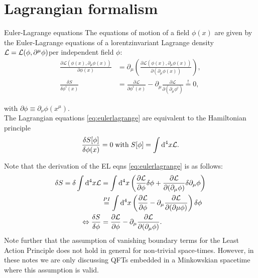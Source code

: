 \section{Lagrangian formalism}
\begin{mybox}{Euler-Lagrange equations}
	The equations of motion of a field $\phi(x)$ are given by the Euler-Lagrange equations of a lorentzinvariant Lagrange density $\mathcal{L} = \mathcal{L}(\phi,\partial^\mu\phi)$per independent field $\phi$:
	\begin{align}
	\label{eq:eulerlagrange}
	\frac{\partial \mathcal{L}\left(\phi(x),\partial_{\mu}\phi(x)\right)}{\partial \phi(x)} &= \partial_{\mu} \left(\frac{\partial \mathcal{L}(\phi(x),\partial_{\mu} \phi(x))}{\partial (\partial_{\mu} \phi(x))}\right),\\
	\frac{\delta S}{\delta \phi^i(x)} &= \frac{\partial \mathcal{L}}{\partial \phi^i(x)} - \partial_{\mu} \frac{\partial \mathcal{L}}{\partial(\partial_{\mu} \phi^i)} \stackrel{!}{=}0,
	\end{align}
	
	with $\partial \phi \equiv \partial_{\nu}\phi(x^{\mu})$.\\
	The Lagrangian equations \ref{eq:eulerlagrange} are equivalent to the Hamiltonian principle
	\begin{equation}
		\frac{\delta S[\phi]}{\delta \phi(x)} = 0 \; \mathrm{with} \; S[\phi] = \int \mathrm{d}^4 x \mathcal{L}.
	\end{equation}
\end{mybox}
Note that the derivation of the EL eqns \ref{eq:eulerlagrange} is as follows:
\begin{align}
	\delta S = \delta \int \mathrm{d}^4 x \mathcal{L} &= \int \mathrm{d}^4 x \left(\frac{\partial \mathcal{L}}{\partial \phi} \delta \phi + \frac{\partial \mathcal{L}}{\partial(\partial_\mu \phi)} \delta \partial_\mu \phi\right)\\
	&\stackrel{PI}{=} \int \mathrm{d}^4 x \left(\frac{\partial \mathcal{L}}{\partial \phi} - \partial_\mu \frac{\partial \mathcal{L}}{\partial(\partial\mu \phi)}\right) \delta \phi \\
	\Leftrightarrow \frac{\delta S}{\delta \phi} &= \frac{\partial \mathcal{L}}{\partial \phi} - \partial_\mu \frac{\partial \mathcal{L}}{\partial(\partial_\mu \phi)}.
\end{align}
Note further that the assumption of vanishing boundary terms for the Least Action Principle does not hold in general for non-trivial space-times. However, in these notes we are only discussing QFTs embedded in a Minkowskian spacetime where this assumption is valid.

